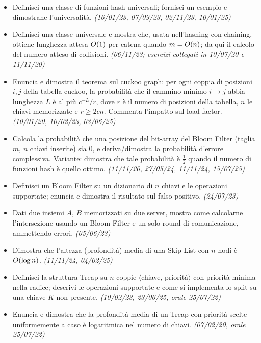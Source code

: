 \begin{itemize}[leftmargin=1.4em]
\item {}\hot Definisci una classe di funzioni hash universali; fornisci un esempio e dimostrane
l'universalit\`a. \emph{(16/01/23, 07/09/23, 02/11/23, 10/01/25)}
\item {} Definisci una classe universale e mostra che, usata nell'hashing con chaining,
ottiene lunghezza attesa $O\!\left(1\right)$ per catena quando $m=O\!\left(n\right)$; da qui il calcolo del numero atteso
di collisioni. \emph{(06/11/23; esercizi collegati in 10/07/20 e 11/11/20)}
\item {}\hot Enuncia e dimostra il teorema sul cuckoo graph: per ogni coppia di posizioni $i,j$
della tabella cuckoo, la probabilit\`a che il cammino minimo $i\to j$ abbia lunghezza $L$ \`e al
pi\`u $c^{-L}/r$, dove $r$ \`e il numero di posizioni della tabella, $n$ le chiavi memorizzate e
$r\ge 2cn$. Commenta l'impatto sul load factor. \emph{(10/01/20, 10/02/23, 03/06/25)}
\item {}\hot Calcola la probabilit\`a che una posizione del bit-array del Bloom Filter (taglia
$m$, $n$ chiavi inserite) sia 0, e deriva/dimostra la probabilit\`a d'errore complessiva. Variante:
dimostra che tale probabilit\`a \`e $\tfrac12$ quando il numero di funzioni hash \`e quello ottimo.
\emph{(11/11/20, 27/05/24, 11/11/24, 15/07/25)}
\item {}\hot Definisci un Bloom Filter su un dizionario di $n$ chiavi e le operazioni supportate;
enuncia e dimostra il risultato sul falso positivo. \emph{(24/07/23)}
\item {} Dati due insiemi $A$, $B$ memorizzati su due server, mostra come calcolarne
l'intersezione usando un Bloom Filter e un solo round di comunicazione, ammettendo errori.
\emph{(05/06/23)}
\item {} Dimostra che l'altezza (profondit\`a) media di una Skip List con $n$ nodi \`e
$O\!\left(\log n\right)$. \emph{(11/11/24, 04/02/25)}
\item {}\hot Definisci la struttura Treap su $n$ coppie $\langle$chiave, priorit\`a$\rangle$ con
priorit\`a minima nella radice; descrivi le operazioni supportate e come si implementa lo split su
una chiave $K$ non presente. \emph{(10/02/23, 23/06/25, orale 25/07/22)}
\item {} Enuncia e dimostra che la profondit\`a media di un Treap con priorit\`a scelte
uniformemente a caso \`e logaritmica nel numero di chiavi. \emph{(07/02/20, orale 25/07/22)}
\end{itemize}

